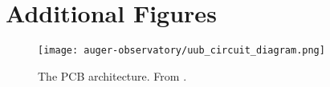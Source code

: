
\chapter{Additional Figures}
\label{app:figures}

\begin{figure}[h]
  \centering
  \texttt{[image: auger-observatory/uub\_circuit\_diagram.png]}
  \caption{The \UUB \acl{PCB} architecture. From
  \cite{suomijarviNewElectronicsSurface2018}.}
  \label{fig:uub-circuit-diagram}
\end{figure}

